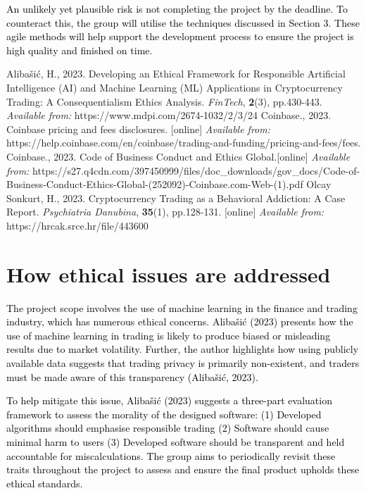 \documentclass[acmtog, nonacm]{acmart}
\begin{document}
\textcolor{black}{An unlikely yet plausible risk is not completing the project by the deadline. To counteract this, the group will utilise the techniques discussed in Section 3. These agile methods will help support the development process to ensure the project is high quality and finished on time. }

\begin{thebibliography}{9}
Alibašić, H., 2023. Developing an Ethical Framework for Responsible Artificial Intelligence (AI) and Machine Learning (ML) Applications in Cryptocurrency Trading: A Consequentialism Ethics Analysis. \textit{FinTech}, \textbf{2}(3), pp.430-443. \textit{Available from:} https://www.mdpi.com/2674-1032/2/3/24 \newline 
Coinbase., 2023. Coinbase pricing and fees disclosures. [online] \textit{Available from:} https://help.coinbase.com/en/coinbase/trading-and-funding/pricing-and-fees/fees.\newline
Coinbase., 2023. Code of Business Conduct and Ethics Global.[online] \textit{Available from: }https://s27.q4cdn.com/397450999/files/doc\_downloads/gov\_docs/Code-of-Business-Conduct-Ethics-Global-(252092)-Coinbase.com-Web-(1).pdf \newline
Olcay Sonkurt, H., 2023. Cryptocurrency Trading as a Behavioral Addiction: A Case Report. \textit{Psychiatria Danubina}, \textbf{35}(1), pp.128-131. [online] \textit{Available from:} https://hrcak.srce.hr/file/443600 \newline
\end{thebibliography}


\appendix

\section{How ethical issues are addressed}
\setlength{\parindent}{20pt}
\textcolor{black}{The project scope involves the use of machine learning in the finance and trading industry, which has numerous ethical concerns. Alibašić (2023) presents how the use of machine learning in trading is likely to produce biased or misleading results due to market volatility. Further, the author highlights how using publicly available data suggests that trading privacy is primarily non-existent, and traders must be made aware of this transparency (Alibašić, 2023).}

\textcolor{black}{To help mitigate this issue, Alibašić (2023) suggests a three-part evaluation framework to assess the morality of the designed software: (1) Developed algorithms should emphasise responsible trading (2) Software should cause minimal harm to users (3) Developed software should be transparent and held accountable for miscalculations. The group aims to periodically revisit these traits throughout the project to assess and ensure the final product upholds these ethical standards.}
\end{document}
